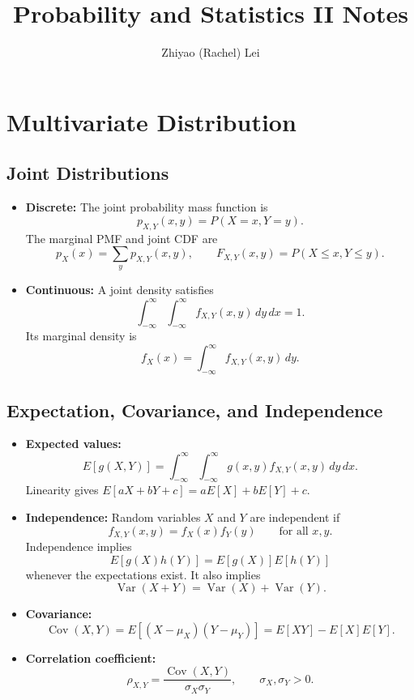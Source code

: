 \documentclass[12pt,a4paper]{article}
\title{\textbf{\color{mainblue} Probability and Statistics II Notes}}
\author{Zhiyao (Rachel) Lei}
\date{}
\begin{document}
\maketitle
\tableofcontents
\newpage

\setcounter{section}{4}

\section{Multivariate Distribution}

\subsection{Joint Distributions}
\begin{itemize}
    \item \textbf{Discrete:} The joint probability mass function is
    \[
        p_{X,Y}(x,y)=P(X=x,Y=y).
    \]
    The marginal PMF and joint CDF are
    \[
        p_X(x)=\sum_y p_{X,Y}(x,y),
        \qquad
        F_{X,Y}(x,y)=P(X\le x,Y\le y).
    \]
    \item \textbf{Continuous:} A joint density satisfies
    \[
        \int_{-\infty}^{\infty}\int_{-\infty}^{\infty}
        f_{X,Y}(x,y)\,dy\,dx=1.
    \]
    Its marginal density is
    \[
        f_X(x)=\int_{-\infty}^{\infty}f_{X,Y}(x,y)\,dy.
    \]
\end{itemize}

\subsection{Expectation, Covariance, and Independence}
\begin{itemize}
    \item \textbf{Expected values:}
    \[
        E[g(X,Y)]
        =\int_{-\infty}^{\infty}\int_{-\infty}^{\infty}
        g(x,y)f_{X,Y}(x,y)\,dy\,dx.
    \]
    Linearity gives $E[aX+bY+c]=aE[X]+bE[Y]+c$.
    \item \textbf{Independence:} Random variables $X$ and $Y$ are independent if
    \[
        f_{X,Y}(x,y)=f_X(x)f_Y(y)
        \qquad\text{for all }x,y.
    \]
    Independence implies
    \[
        E[g(X)h(Y)]=E[g(X)]E[h(Y)]
    \]
    whenever the expectations exist. It also implies
    \[
        \operatorname{Var}(X+Y)
        =\operatorname{Var}(X)+\operatorname{Var}(Y).
    \]
    \item \textbf{Covariance:}
    \[
        \operatorname{Cov}(X,Y)
        =E[(X-\mu_X)(Y-\mu_Y)]
        =E[XY]-E[X]E[Y].
    \]
    \item \textbf{Correlation coefficient:}
    \[
        \rho_{X,Y}
        =\frac{\operatorname{Cov}(X,Y)}{\sigma_X\sigma_Y},
        \qquad \sigma_X,\sigma_Y>0.
    \]
\end{itemize}
\end{document}
